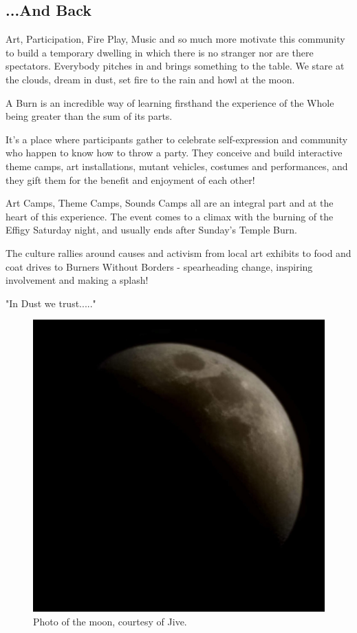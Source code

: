 \subsection*{...And Back}
Art, Participation, Fire Play, Music and so much more motivate this 
community to build a temporary dwelling in which there is no stranger nor are there spectators. Everybody pitches in and brings something to the table.  
We stare at the clouds, dream in dust, set fire to the rain and howl at the moon.  

A Burn is an incredible way of learning firsthand the experience of the Whole being greater than the sum of its parts.  

It's a place where participants gather to celebrate self-expression and community who happen to know how to throw a party.  They conceive and build interactive theme camps, art installations, mutant vehicles, costumes and performances, and they gift them for the benefit and enjoyment of each other!

Art Camps, Theme Camps, Sounds Camps all are an integral part and at the heart of this experience.  The event comes to a climax with the burning of the Effigy Saturday night, and usually ends after Sunday's Temple Burn. 

The culture rallies around causes and activism from local art exhibits to food and coat drives to Burners Without Borders - spearheading change, inspiring involvement and making a splash! 

"In Dust we trust....."


\vspace*{\fill}
\begin{figure}[!h]
\centering
\includegraphics[width=.8\textwidth]{images/filler-images/JivePurkeyMoon.jpg} 
\caption{Photo of the moon, courtesy of Jive.}
\label{image:mountainmoom}
\end{figure}
\vspace*{\fill}

